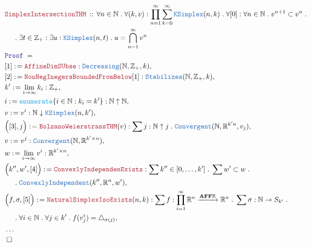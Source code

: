 \documentclass[12pt]{scrartcl}
\newcommand{\TYPE}[1]{\textcolor{NavyBlue}{\mathtt{#1}}}
\newcommand{\FUNC}[1]{\textcolor{Cerulean}{\mathtt{#1}}}
\newcommand{\LOGIC}[1]{\textcolor{Blue}{\mathtt{#1}}}
\newcommand{\THM}[1]{\textcolor{Maroon}{\mathtt{#1}}}
\renewcommand{\.}{\; . \;}
\newcommand{\de}{: \kern 0.1pc =}
\newcommand{\Theorem}[2]{& \THM{#1} \, :: \, #2 \\ & \Proof = \\ }
\newcommand{\NewLine}{\\ & \kern 1pc}
\newcommand{\Page}[1]{ \begin{align*} #1 \end{align*}   }
\newcommand{\NoProof}{ & \ldots \\ \EndProof}
\newcommand{\Int}{\mathbb{Z} }
\newcommand{\Reals}{\mathbb{R} }
\newcommand{\Nat}{\mathbb{N} }
\newcommand{\Arrow}{\xrightarrow}
\newcommand{\Say}[3]{& #1 \de #2 : #3, \\}
\newcommand{\QED}{\; \square}
\newcommand{\EndProof}{& \QED \\}
\newcommand{\Proof}{\LOGIC{Proof} \; }
\newcommand{\AFF}{\mathbf{AFF}}
\begin{document}
\Page{
	\Theorem{SimplexIntersectionTHM}
	{
		\forall n \in \Nat \.
		\forall  (k,v) : \prod^\infty_{n=1} \sum^\infty_{k=0} \TYPE{KSimplex}(n,k) \.
		\forall [0] : \forall n \in \Nat \. v^{n+1} \subset v^n \. \NewLine \.
		\exists t \in \Int_+ :
		\exists u : \TYPE{KSimplex}(n,t) \.
		u = \bigcap^\infty_{n=1} v^n
	}
	\Say{[1]}{\THM{AffineDimSUbse}}{\TYPE{Decreasing}(\Nat,\Int_+,k)}
	\Say{[2]}{\THM{NonNegInegersBoundedFromBelow}[1]}
	{
		\TYPE{Stabilizes}(\Nat,\Int_+,k)
	}
	\Say{k'}{\lim_{i \to \infty} k_i}{\Int_+}
	\Say{i}{\FUNC{enumerate}\{ i \in \Nat : k_i = k' \}}{\Nat \uparrow \Nat}
	\Say{v}{v^i}{\Nat \downarrow \TYPE{KSimplex}(n,k')}
	\Say{\Big([3], j\Big)}
	{
		\THM{BolzanoWeierstrassTHM}(v)
	}
	{
		\sum j : \Nat \uparrow j \. \TYPE{Convergent}(\Nat, \Reals^{k'n},v_j)
	}
	\Say{v}{v^j}{\TYPE{Convergent}(\Nat,\Reals^{k'\times n})}
	\Say{w}{\lim_{i \to \infty} v^i}{\Reals^{k'\times n}}
	\Say{\Big( k'',w',[4]\Big)}{\THM{ConvexlyIndependenExists}}
	{
		\sum k'' \in [0,\ldots,k'] \.
		\sum w' \subset w \. \NewLine \.  
		 \TYPE{ConvexlyIndependent}(k'',\Reals^n,w')
	}
	\Say{\Big(f,\sigma,[5]\Big)}{\THM{NaturalSimplexIsoExists}(n,k)}
	{
		\sum f : \prod^\infty_{i=1} \Reals^n \Arrow{\AFF{\Reals}} \Reals^n \.
		\sum \sigma : \Nat \to S_{k'} \.
		\NewLine \. 
		\forall i \in \Nat \. 
		\forall j \in k'  \. 
		f(v^i_j) = \triangle_{\sigma(j)}
	}
	\NoProof
}
\newpage
\end{document}
